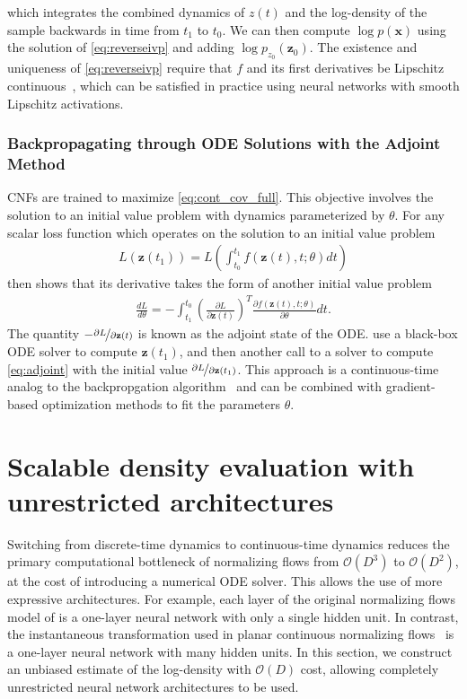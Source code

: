 \documentclass{article} %
\newcommand{\z}{\mathbf{z}}
\newcommand{\x}{\mathbf{x}}
\newcommand\0{\kern-1.2pt\vec{\kern1.2pt 0}}
\begin{document}
which integrates the combined dynamics of $z(t)$ and the log-density of the sample backwards in time from $t_1$ to $t_0$.
We can then compute $\log p(\x)$ using the solution of \eqref{eq:reverseivp} and adding $\log p_{z_0}(\z_0)$.
The existence and uniqueness of \eqref{eq:reverseivp} require that $f$ and its first derivatives be Lipschitz continuous~\citep{khalil2002nonlinear}, which can be satisfied in practice using neural networks with smooth Lipschitz activations.

\subsubsection{Backpropagating through ODE Solutions with the Adjoint Method}
CNFs are trained to maximize \eqref{eq:cont_cov_full}. This objective involves the solution to an initial value problem with dynamics parameterized by $\theta$. For any scalar loss function which operates on the solution to an initial value problem
\begin{align}\label{eq:loss}
    L(\z(t_1)) = L\left(\int_{t_0}^{t_1} f(\z(t), t; \theta)dt\right)
\end{align}
then \citet{pontryagin2018mathematical} shows that its derivative takes the form of another initial value problem
\begin{align}\label{eq:adjoint}
    \frac{dL}{d\theta} = -\int_{t_1}^{t_0}\left(\frac{\partial L}{\partial \z(t)}\right)^T  \frac{\partial f(\z(t), t; \theta)}{\partial \theta} dt.
\end{align}
The quantity $-\nicefrac{\partial L}{\partial \z(t)}$ is known as the adjoint state of the ODE. \citet{chen2018neural} use a black-box ODE solver to compute $\z(t_1)$, and then another call to a solver to compute \eqref{eq:adjoint} with the initial value $\nicefrac{\partial L}{\partial \z(t_1)}$.
This approach is a continuous-time analog to the backpropgation algorithm~\citep{rumelhart1986learning,andersson2013general} and can be combined with gradient-based optimization methods to fit the parameters $\theta$.

\section{Scalable density evaluation with unrestricted architectures}

Switching from discrete-time dynamics to continuous-time dynamics reduces the primary computational bottleneck of normalizing flows from $\mathcal{O}(D^3)$ to $\mathcal{O}(D^2)$, at the cost of introducing a numerical ODE solver.
This allows the use of more expressive architectures.
For example, each layer of the original normalizing flows model of \citet{rezende2015variational} is a one-layer neural network with only a single hidden unit.
In contrast, the instantaneous transformation used in planar continuous normalizing flows~\citep{chen2018neural} is a one-layer neural network with many hidden units.
In this section, we construct an unbiased estimate of the log-density with $\mathcal{O}(D)$ cost, allowing completely unrestricted neural network architectures to be used.
\end{document}
